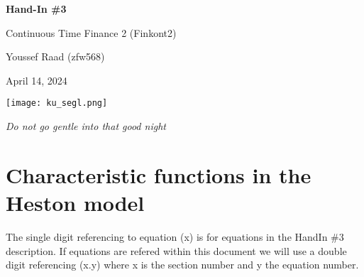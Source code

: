 \documentclass[12pt]{article}
\numberwithin{equation}{section}
\begin{document}
\begin{titlepage}
    \begin{center}
        \vspace*{1cm}
        
        
        \Huge
        \textbf{Hand-In \#3}
        
        \vspace{0.5cm}
        \LARGE
        Continuous Time Finance 2 (Finkont2)
        
        \vspace{0.5cm}
        
        Youssef Raad (zfw568)
    
        
        \vspace{0.5cm}
         April  14, 2024
        
    \end{center}
    \vspace{2.5cm}
    \begin{center}
        \texttt{[image: ku\_segl.png]}
    \end{center}
    \vspace{5 cm}
    \begin{center}
        \textit{Do not go gentle into that good night}
    \end{center}
\end{titlepage}
\captionsetup[figure]{labelfont=bf} \captionsetup[table]{labelfont=bf}
\fancyhead[R]{ }
\setlength{\headheight}{40pt}
\newpage
\tableofcontents
\cfoot{\thepage\ / \pageref{LastPage}}


\newpage
\section{Characteristic functions in the Heston model}
The single digit referencing to equation (x) is for equations in the HandIn \#3
description. If equations are refered within this document we will use a double
digit referencing (x.y) where x is the section number and y the equation number. 
\end{document}
